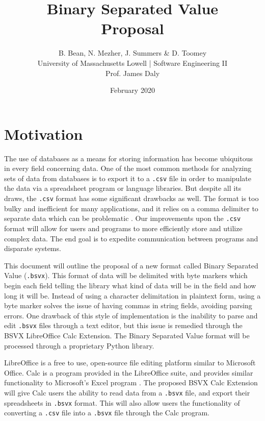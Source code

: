 \documentclass[10pt]{article}
\begin{document}
\title{Binary Separated Value\\Proposal}
\author{B. Bean, N. Mezher, J. Summers \& D. Toomey\\University of Massachusetts Lowell | Software Engineering II\\Prof. James Daly}
\date{February 2020}
\maketitle

\section*{Motivation}

The use of databases as a means for storing information has become ubiquitous in every field concerning data.
One of the most common methods for analyzing sets of data from databases is to export it to a \texttt{.csv} file in order to manipulate the data via a spreadsheet program or language libraries.
But despite all its draws, the \texttt{.csv} format has some significant drawbacks as well.
The format is too bulky and inefficient for many applications, and it relies on a comma delimiter to separate data which can be problematic \cite{Coleman2011}.
Our improvements upon the \texttt{.csv} format will allow for users and programs to more efficiently store and utilize complex data.
The end goal is to expedite communication between programs and disparate systems.

\indent{}
This document will outline the proposal of a new format called Binary Separated Value (\texttt{.bsvx}).
This format of data will be delimited with byte markers which begin each field telling the library what kind of data will be in the field and how long it will be.
Instead of using a character delimitation in plaintext form, using a byte marker solves the issue of having commas in string fields, avoiding parsing errors.
One drawback of this style of implementation is the inability to parse and edit \texttt{.bsvx} files through a text editor, but this issue is remedied through the BSVX LibreOffice Calc Extension.
The Binary Separated Value format will be processed through a proprietary Python library.

\indent{}
LibreOffice is a free to use, open-source file editing platform similar to Microsoft Office.
Calc is a program provided in the LibreOffice suite, and provides similar functionality to Microsoft’s Excel program \cite{Guthrie2012}.
The proposed BSVX Calc Extension will give Calc users the ability to read data from a \texttt{.bsvx} file, and export their spreadsheets in \texttt{.bsvx} format.
This will also allow users the functionality of converting a \texttt{.csv} file into a \texttt{.bsvx} file through the Calc program.
\end{document}

